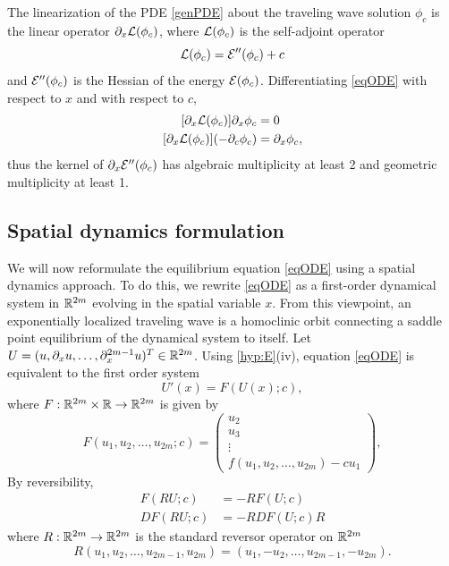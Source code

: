 \documentclass[10pt,reqno]{amsart}
\theoremstyle{plain}
\theoremstyle{definition}
\theoremstyle{remark}
\numberwithin{theorem}{section}
\numberwithin{equation}{section}
\begin{document}
The linearization of the PDE \cref{genPDE} about the traveling wave solution $\phi_c$ is the linear operator $\partial_x \mathcal{L}(\phi_c)$, where $\mathcal{L}(\phi_c)$ is the self-adjoint operator
\begin{equation}\label{PDElinearization}
\mathcal{L}(\phi_c) = \mathcal{E}''(\phi_c) + c
\end{equation}
and $\mathcal{E}''(\phi_c)$ is the Hessian of the energy $\mathcal{E}(\phi_c)$. Differentiating \cref{eqODE} with respect to $x$ and with respect to $c$,
\begin{equation}\label{Ekernel}
\begin{aligned}
[\partial_x \calL(\phi_c)] \partial_x \phi_c &= 0 \\
[\partial_x \calL(\phi_c)](-\partial_c \phi_c) &= \partial_x \phi_c,
\end{aligned}
\end{equation}
thus the kernel of $\partial_x \mathcal{E}''(\phi_c)$ has algebraic multiplicity at least 2 and geometric multiplicity at least 1.

\subsection{Spatial dynamics formulation}\label{sec:spatdym}

We will now reformulate the equilibrium equation \cref{eqODE} using a spatial dynamics approach. To do this, we rewrite \cref{eqODE} as a first-order dynamical system in $\mathbb{R}^{2m}$ evolving in the spatial variable $x$. From this viewpoint, an exponentially localized traveling wave is a homoclinic orbit connecting a saddle point equilibrium of the dynamical system to itself. Let $U = (u, \partial_x u, \dots, \partial_x^{2m-1} u)^T \in \mathbb{R}^{2m}$. Using \cref{hyp:E}(iv), equation \cref{eqODE} is equivalent to the first order system
\begin{equation}\label{genODE}
U'(x) = F(U(x); c),
\end{equation}
where $F: \mathbb{R}^{2m} \times \mathbb{R} \rightarrow \mathbb{R}^{2m}$ is given by
\begin{equation}\label{defF}
F(u_1, u_2, \dots, u_{2m}; c) = 
\begin{pmatrix}
u_2 \\ u_3 \\ \vdots \\ f(u_1, u_2, \dots, u_{2m}) - c u_1
\end{pmatrix},
\end{equation}
By reversibility,
\begin{equation}\label{genODErev}
\begin{aligned}
F(RU; c) &= -RF(U; c) \\
DF(RU; c) &= -RDF(U; c)R
\end{aligned}
\end{equation}
where $R:\mathbb{R}^{2m} \rightarrow \mathbb{R}^{2m}$ is the standard reversor operator on $\mathbb{R}^{2m}$
\begin{equation}\label{reverserR2m}
R(u_1, u_2, \dots, u_{2m-1}, u_{2m}) = (u_1, -u_2, \dots, u_{2m-1}, -u_{2m}).
\end{equation}
\end{document}
